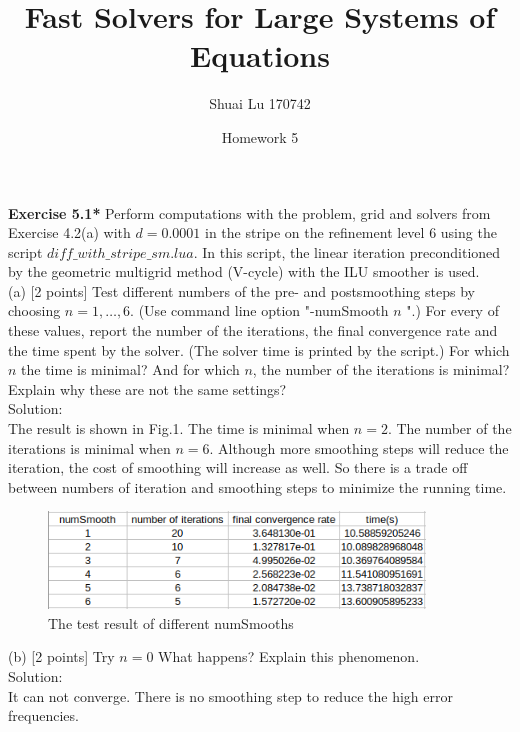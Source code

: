 \documentclass[a4paper]{article}
\title{Fast Solvers for Large Systems of Equations}
\author{Shuai Lu 170742}
\date{Homework 5}
\begin{document}
\maketitle
\noindent \textbf{Exercise 5.1*} Perform computations with the problem, grid and solvers from Exercise 4.2(a) with $d=0.0001$ in the stripe on the refinement level 6 using the script $diff\_with\_stripe\_sm.lua$. In this script, the linear iteration preconditioned by the geometric multigrid method (V-cycle) with the ILU smoother is used.\\

\noindent (a) [2 points] Test different numbers of the pre- and postsmoothing steps by choosing $n=1, \ldots, 6$. (Use command line option "-numSmooth $n$ ".) For every of these values, report the number of the iterations, the final convergence rate and the time spent by the solver. (The solver time is printed by the script.) For which $n$ the time is minimal? And for which $n$, the number of the iterations is minimal? Explain why these are not the same settings?\\

\noindent Solution:\\
\noindent The result is shown in Fig.1. The time is minimal when $n=2$. The number of the iterations is minimal when $n=6$. Although more smoothing steps will reduce the iteration, the cost of smoothing will increase as well. So there is a trade off between numbers of iteration and smoothing steps to minimize the running time. \\
\begin{figure}[htbp]
	\centering
	\begin{minipage}[t]{0.7\textwidth}
		\centering		\includegraphics[width=10cm]{5.1a.png}
		\caption{The test result of different numSmooths}
	\end{minipage}
\end{figure}

\noindent (b) [2 points] Try $n=0$ What happens? Explain this phenomenon.\\

\noindent Solution:\\
\noindent It can not converge. There is no smoothing step to reduce the high error frequencies.\\
\end{document}
